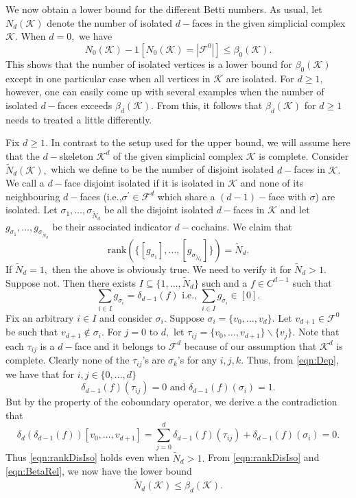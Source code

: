 \documentclass[12pt]{amsart}
\numberwithin{equation}{section}
\numberwithin{theorem}{section}
\newcommand{\cobdr}{\delta}
\newcommand{\1}{\mathbf{1}}
\def\F{\mathcal{F}}
\def\K{\mathcal{K}}
\def\rank{\mathrm{rank}}
\begin{document}
We now obtain a lower bound for the different Betti numbers. As usual, let $N_d(\K)$ denote the number of isolated $d-$faces in the given simplicial complex $\K.$ When $d = 0,$ we have
\[
N_0(\K) - 1[N_0(\K) = |\F^0| ] \leq \beta_0(\K).
\]
This shows that the number of isolated vertices is a lower bound for $\beta_0(\K)$ except in one particular case when all vertices in $\K$ are isolated. For $d \geq 1,$ however, one can easily come up with several examples when the number of isolated $d-$faces exceeds $\beta_d(\K).$ From this, it follows that $\beta_{d}(\K)$ for $d \geq 1$ needs to treated a little differently.

Fix $d \geq 1.$ In contrast to the setup used for the upper bound, we will assume here that the $d-$skeleton $\K^d$ of the given simplicial complex $\K$ is complete. Consider $\tilde{N}_{d}(\K),$ which we define to be the number of disjoint isolated $d-$faces in $\K.$ We call a $d-$face disjoint isolated if it is isolated in $\K$ and none of its neighbouring $d-$faces (i.e.,$\sigma^\prime \in \F^{d}$ which share a $(d - 1)-$face with $\sigma$) are isolated. Let $\sigma _1, \ldots, \sigma_{\tilde{N}_d}$ be all the disjoint isolated $d-$faces in $\K$ and let $g_{\sigma_1}, \ldots, g_{\sigma_{\tilde{N}_d}}$ be their associated indicator $d-$cochains. We claim that
\begin{equation}
\label{eqn:rankDisIso}
\rank(\{[g_{\sigma_1}], \ldots, [g_{\sigma_{\tilde{N}_d}}]\}) = \tilde{N}_d.
\end{equation}
If $\tilde{N}_d = 1,$ then the above is obviously true. We need to verify it for $\tilde{N}_d > 1.$ Suppose not. Then there exists $I \subseteq \{1, \ldots, \tilde{N}_d\}$ such and  a $f \in C^{d - 1}$ such that
%	
\begin{equation}
\label{eqn:Dep}
\sum_{i \in I} g_{\sigma_i} = \cobdr_{d - 1}(f) \, \, \mbox{i.e.,} \, \, \sum_{i \in I} g_{\sigma_i} \in [0].
\end{equation}
%		
Fix an arbitrary $i \in I$ and consider $\sigma_i.$ Suppose $\sigma_i = \{v_0, \ldots, v_d\}.$ Let $v_{d + 1} \in \F^{0}$ be such that $v_{d + 1} \notin \sigma_i.$ For $j = 0$ to $d,$ let $\tau_{ij} = \{v_0, \ldots, v_{d + 1}\} \backslash \{v_j\}.$ Note that each $\tau_{ij}$ is a $d-$face and it belongs to $\F^d$ because of our assumption that $\K^d$ is complete. Clearly none of the $\tau_{ij}$'s are $\sigma_k$'s for any $i,j,k$. Thus, from \eqref{eqn:Dep}, we have that for $i,j \in \{0,\ldots,d\}$
\[
\cobdr_{d - 1}(f)(\tau_{ij}) = 0 \, \, \mbox{and} \, \,  \cobdr_{d - 1}(f)(\sigma_i) = 1.
\]
But by the property of the coboundary operator, we derive a the contradiction that
\[
\cobdr_d (\cobdr_{d-1}(f))[v_0,\ldots,v_{d+1}] = \sum_{j = 0}^{d} \cobdr_{d - 1}(f)(\tau_{ij}) + \cobdr_{d - 1}(f)(\sigma_i) = 0.
\]
Thus \eqref{eqn:rankDisIso} holds even when $\tilde{N}_d > 1.$ From \eqref{eqn:rankDisIso} and \eqref{eqn:BetaRel}, we now have the lower bound
%
\begin{equation}
\label{eqn:Lwr_Bd_Betti_d}
\tilde{N}_{d}(\K) \leq \beta_{d}(\K).
\end{equation}
%
\end{document}

